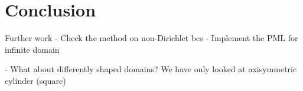 \chapter{Conclusion}


Further work
- Check the method on non-Dirichlet bcs
- Implement the PML for infinite domain

- What about differently shaped domains?
    We have only looked at axisymmetric cylinder (square)

